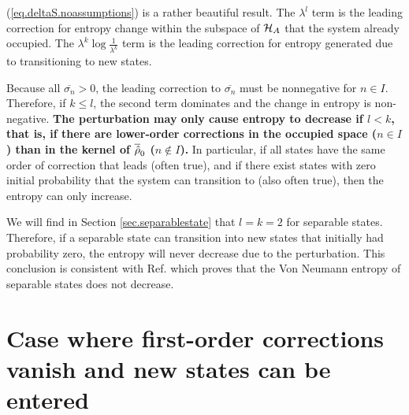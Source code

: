 (\ref{eq.deltaS.noassumptions}) is a rather beautiful result. The \(\lambda^l\) term is the leading correction for entropy change within the subspace of \(\mathcal{H}_A\) that the system already occupied. The \(\lambda^k \log \frac{1}{\lambda^k}\) term is the leading correction for entropy generated due to transitioning to new states.

Because all \(\overline{\sigma_n} > 0\), the leading correction to \(\overline{\sigma_n}\) must be nonnegative for \(n \in I\). Therefore, if \(k \leq l\), the second term dominates and the change in entropy is non-negative. {\bf The perturbation may only cause entropy to decrease if \(l < k\), that is, if there are lower-order corrections in the occupied space (\(n \in I\)) than in the kernel of \(\overline{\hat{\rho}}_0\) (\(n \not\in I\)).} In particular, if all states have the same order of correction that leads (often true), and if there exist states with zero initial probability that the system can transition to (also often true), then the entropy can only increase.

We will find in Section \ref{sec.separablestate} that \(l=k=2\) for separable states. Therefore, if a separable state can transition into new states that initially had probability zero, the entropy will never decrease due to the perturbation. This conclusion is consistent with Ref. \cite{bracken} which proves that the Von Neumann entropy of separable states does not decrease.

\section{Case where first-order corrections vanish and new states can be entered}

